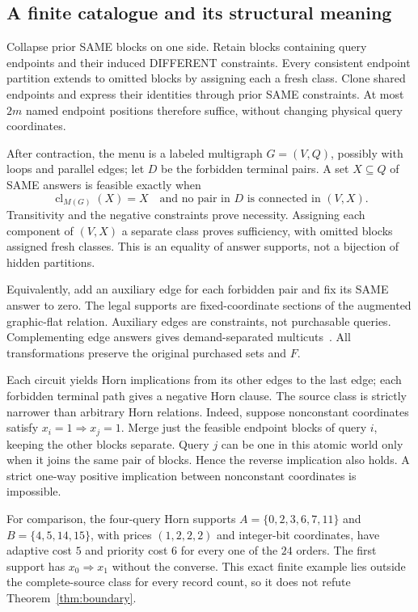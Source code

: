 \documentclass[pdflatex,sn-mathphys-num]{sn-jnl}
\newcommand{\cl}{\operatorname{cl}}
\theoremstyle{thmstyleone}
\theoremstyle{thmstylethree}
\theoremstyle{thmstyletwo}
\begin{document}
\subsection{A finite catalogue and its structural meaning}\label{sec:catalogue}
Collapse prior SAME blocks on one side. Retain blocks containing query endpoints and their induced DIFFERENT constraints. Every consistent endpoint partition extends to omitted blocks by assigning each a fresh class. Clone shared endpoints and express their identities through prior SAME constraints. At most $2m$ named endpoint positions therefore suffice, without changing physical query coordinates.

After contraction, the menu is a labeled multigraph $G=(V,Q)$, possibly with loops and parallel edges; let $D$ be the forbidden terminal pairs. A set $X\subseteq Q$ of SAME answers is feasible exactly when
\begin{equation}\label{eq:flat}
 \cl_{M(G)}(X)=X
 \quad\text{and no pair in }D\text{ is connected in }(V,X).
\end{equation}
Transitivity and the negative constraints prove necessity. Assigning each component of $(V,X)$ a separate class proves sufficiency, with omitted blocks assigned fresh classes. This is an equality of answer supports, not a bijection of hidden partitions.

Equivalently, add an auxiliary edge for each forbidden pair and fix its SAME answer to zero. The legal supports are fixed-coordinate sections of the augmented graphic-flat relation. Auxiliary edges are constraints, not purchasable queries. Complementing edge answers gives demand-separated multicuts~\cite{berczi,hornakova}. All transformations preserve the original purchased sets and $F$.

Each circuit yields Horn implications from its other edges to the last edge; each forbidden terminal path gives a negative Horn clause. The source class is strictly narrower than arbitrary Horn relations. Indeed, suppose nonconstant coordinates satisfy $x_i=1\Rightarrow x_j=1$. Merge just the feasible endpoint blocks of query $i$, keeping the other blocks separate. Query $j$ can be one in this atomic world only when it joins the same pair of blocks. Hence the reverse implication also holds. A strict one-way positive implication between nonconstant coordinates is impossible.

For comparison, the four-query Horn supports $A=\{0,2,3,6,7,11\}$ and $B=\{4,5,14,15\}$, with prices $(1,2,2,2)$ and integer-bit coordinates, have adaptive cost $5$ and priority cost $6$ for every one of the $24$ orders. The first support has $x_0\Rightarrow x_1$ without the converse. This exact finite example lies outside the complete-source class for every record count, so it does not refute Theorem~\ref{thm:boundary}.
\end{document}
